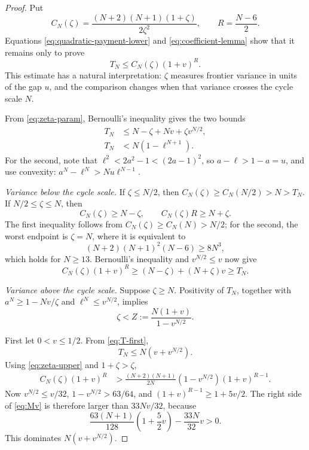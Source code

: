 \documentclass[11pt]{article}
\begin{document}
\begin{proof}
Put
\begin{equation}\label{eq:Czeta}
 C_N(\zeta)=\frac{(N+2)(N+1)(1+\zeta)}{2\zeta^2},
 \qquad R=\frac{N-6}{2}.
\end{equation}
Equations \eqref{eq:quadratic-payment-lower} and
\eqref{eq:coefficient-lemma} show that it remains only to prove
\begin{equation}\label{eq:TN-core}
        T_N\le C_N(\zeta)(1+v)^R.
\end{equation}
This estimate has a natural interpretation: \(\zeta\) measures frontier
variance in units of the gap \(u\), and the comparison changes when that
variance crosses the cycle scale \(N\).

From \eqref{eq:zeta-param}, Bernoulli's inequality gives the two bounds
\begin{align}
 T_N&\le N-\zeta+Nv+\zeta v^{N/2},\label{eq:T-first}\\
 T_N&<N(1-\ell^{N+1}).\label{eq:T-second}
\end{align}
For the second, note that
\(\ell^2<2a^2-1<(2a-1)^2\), so \(a-\ell>1-a=u\), and use
convexity: \(a^N-\ell^N>N u\ell^{N-1}\).

\smallskip
\noindent\emph{Variance below the cycle scale.}
If \(\zeta\le N/2\), then \(C_N(\zeta)\ge C_N(N/2)>N>T_N\).
If \(N/2\le\zeta\le N\), then
\begin{equation}\label{eq:C-two}
        C_N(\zeta)\ge N-\zeta,\qquad
        C_N(\zeta)R\ge N+\zeta.
\end{equation}
The first inequality follows from
\(C_N(\zeta)\ge C_N(N)>N/2\); for the second, the worst endpoint is
\(\zeta=N\), where it is equivalent to
\[
 (N+2)(N+1)^2(N-6)\ge8N^3,
\]
which holds for \(N\ge13\).  Bernoulli's inequality and
\(v^{N/2}\le v\) now give
\[
 C_N(\zeta)(1+v)^R
 \ge(N-\zeta)+(N+\zeta)v
 \ge T_N.
\]

\smallskip
\noindent\emph{Variance above the cycle scale.}
Suppose \(\zeta\ge N\).  Positivity of \(T_N\), together with
\(a^N\ge1-Nv/\zeta\) and \(\ell^N\le v^{N/2}\), implies
\begin{equation}\label{eq:zeta-upper}
 \zeta<Z:=\frac{N(1+v)}{1-v^{N/2}}.
\end{equation}

First let \(0<v\le1/2\).  From \eqref{eq:T-first},
\[
        T_N\le N(v+v^{N/2}).
\]
Using \eqref{eq:zeta-upper} and \(1+\zeta>\zeta\),
\begin{align}
 C_N(\zeta)(1+v)^R
 &>
 \frac{(N+2)(N+1)}{2N}
 (1-v^{N/2})(1+v)^{R-1}.\label{eq:Mv}
\end{align}
Now \(v^{N/2}\le v/32\), \(1-v^{N/2}>63/64\), and
\((1+v)^{R-1}\ge1+5v/2\).  The right side of \eqref{eq:Mv} is therefore
larger than \(33Nv/32\), because
\[
 \frac{63(N+1)}{128}\left(1+\frac52v\right)
 -\frac{33N}{32}v>0.
\]
This dominates \(N(v+v^{N/2})\).


\end{proof}
\end{document}
